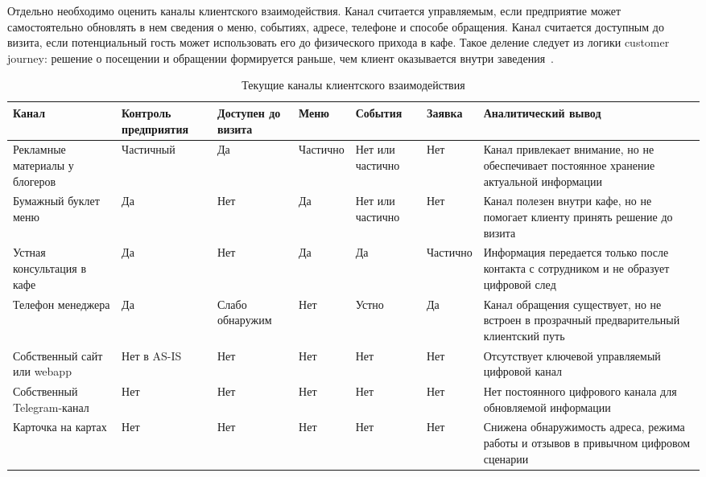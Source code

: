 Отдельно необходимо оценить каналы клиентского взаимодействия. Канал считается управляемым, если предприятие может самостоятельно обновлять в нем сведения о меню, событиях, адресе, телефоне и способе обращения. Канал считается доступным до визита, если потенциальный гость может использовать его до физического прихода в кафе. Такое деление следует из логики customer journey: решение о посещении и обращении формируется раньше, чем клиент оказывается внутри заведения~\cite{stickdorn2018,rita2022}.

\begin{table}[H]
\centering
\footnotesize
\caption{Текущие каналы клиентского взаимодействия}
\label{tab:ch2_current_channels}
\setlength{\tabcolsep}{3pt}
\begin{tabularx}{\textwidth}{|>{\raggedright\arraybackslash}p{}|>{\centering\arraybackslash}p{}|>{\centering\arraybackslash}p{}|>{\centering\arraybackslash}p{}|>{\centering\arraybackslash}p{}|>{\centering\arraybackslash}p{}|>{\raggedright\arraybackslash}X|}
\hline
\textbf{Канал} & \textbf{Контроль предприятия} & \textbf{Доступен до визита} & \textbf{Меню} & \textbf{События} & \textbf{Заявка} & \textbf{Аналитический вывод} \\ \hline
Рекламные материалы у блогеров & Частичный & Да & Частично & Нет или частично & Нет & Канал привлекает внимание, но не обеспечивает постоянное хранение актуальной информации \\ \hline
Бумажный буклет меню & Да & Нет & Да & Нет или частично & Нет & Канал полезен внутри кафе, но не помогает клиенту принять решение до визита \\ \hline
Устная консультация в кафе & Да & Нет & Да & Да & Частично & Информация передается только после контакта с сотрудником и не образует цифровой след \\ \hline
Телефон менеджера & Да & Слабо обнаружим & Нет & Устно & Да & Канал обращения существует, но не встроен в прозрачный предварительный клиентский путь \\ \hline
Собственный сайт или webapp & Нет в AS-IS & Нет & Нет & Нет & Нет & Отсутствует ключевой управляемый цифровой канал \\ \hline
Собственный Telegram-канал & Нет & Нет & Нет & Нет & Нет & Нет постоянного цифрового канала для обновляемой информации \\ \hline
Карточка на картах & Нет & Нет & Нет & Нет & Нет & Снижена обнаружимость адреса, режима работы и отзывов в привычном цифровом сценарии \\ \hline
\end{tabularx}
\normalsize
\end{table}

